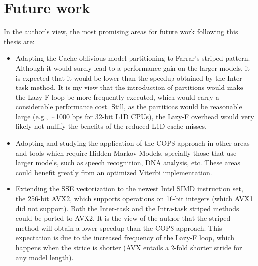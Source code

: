\section{Future work}

In the author's view, the most promising areas for future work following this thesis are:

\begin{itemize}

\item Adapting the Cache-oblivious model partitioning to Farrar's striped pattern. Although it would surely lead to a performance gain on the larger models, it is expected that it would be lower than the speedup obtained by the Inter-task method. It is my view that the introduction of partitions would make the Lazy-F loop be more frequently executed, which would carry a considerable performance cost. Still, as the partitions would be reasonable large (e.g., $\sim$1000 bps for 32-bit L1D CPUs), the Lazy-F overhead would very likely not nullify the benefits of the reduced L1D cache misses.

\item Adopting and studying the application of the COPS approach in other areas and tools which require Hidden Markov Models, specially those that use larger models, such as speech recognition, DNA analysis, etc. These areas could benefit greatly from an optimized Viterbi implementation.

\item Extending the SSE vectorization to the newest Intel SIMD instruction set, the 256-bit AVX2, which supports operations on 16-bit integers (which AVX1 did not support). Both the Inter-task and the Intra-task striped methods could be ported to AVX2. It is the view of the author that the striped method will obtain a lower speedup than the COPS approach. This expectation is due to the increased frequency of the Lazy-F loop, which happens when the stride is shorter (AVX entails a 2-fold shorter stride for any model length).


\end{itemize}

